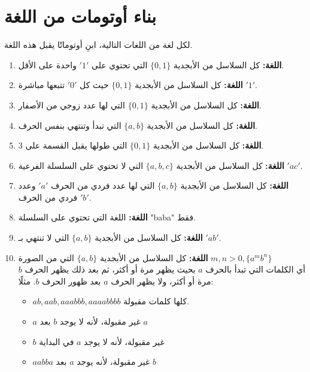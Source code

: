 \documentclass[12pt]{article}
\begin{document}
\clearpage
\section{بناء أوتومات من اللغة}

لكل لغة من اللغات التالية، ابنِ أوتوماتًا يقبل هذه اللغة.

\begin{enumerate}

\item
\textbf{اللغة:} كل السلاسل من الأبجدية $\{0, 1\}$ التي تحتوي على $'1'$ واحدة على الأقل.

\item
\textbf{اللغة:} كل السلاسل من الأبجدية $\{0, 1\}$ حيث كل $'0'$ تتبعها مباشرة $'1'$.

\item
\textbf{اللغة:} كل السلاسل من الأبجدية $\{0, 1\}$ التي لها عدد زوجي من الأصفار.

\item
\textbf{اللغة:} كل السلاسل من الأبجدية $\{a, b\}$ التي تبدأ وتنتهي بنفس الحرف.

\item
\textbf{اللغة:} كل السلاسل من الأبجدية $\{0, 1\}$ التي طولها يقبل القسمة على 3.

\item
\textbf{اللغة:} كل السلاسل من الأبجدية $\{a, b, c\}$ التي لا تحتوي على السلسلة الفرعية $'ac'$.

\item
\textbf{اللغة:} كل السلاسل من الأبجدية $\{a, b\}$ التي لها عدد فردي من الحرف $'a'$ وعدد فردي من الحرف $'b'$.

\item
\textbf{اللغة:} اللغة التي تحتوي على السلسلة "baba" فقط.

\item
\textbf{اللغة:} كل السلاسل من الأبجدية $\{a, b\}$ التي لا تنتهي بـ $'ab'$.

\item
\textbf{اللغة:} كل السلاسل من الأبجدية $\{a, b\}$ التي من الصورة $m,n>0, \{a^mb^n\}$ \\
أي الكلمات التي تبدأ بالحرف $a$ بحيث يظهر مرة أو أكثر، ثم بعد ذلك يظهر الحرف $b$ مرة أو أكثر، ولا يظهر الحرف $a$ بعد ظهور الحرف $b$.
مثلًا:
\begin{itemize}
\item $ab , aab, aaabbb, aaaabbbb$ كلها كلمات مقبولة.
\item $a$ غير مقبولة، لأنه لا يوجد $b$ بعد $a$
\item $b$ غير مقبولة، لأنه لا يوجد $a$ في البداية
\item $aabba$ غير مقبولة، لأنه يوجد $a$ بعد $b$
\end{itemize}


\end{enumerate}
\end{document}
